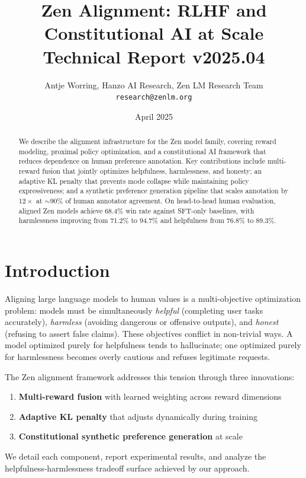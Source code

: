 \documentclass[11pt,a4paper]{article}
\title{\textbf{Zen Alignment: RLHF and Constitutional AI at Scale}\\
\large Technical Report v2025.04}
\author{Antje Worring, Hanzo AI Research, Zen LM Research Team\\
\texttt{research@zenlm.org}}
\date{April 2025}
\begin{document}
\maketitle

\begin{abstract}
We describe the alignment infrastructure for the Zen model family, covering reward
modeling, proximal policy optimization, and a constitutional AI framework that reduces
dependence on human preference annotation. Key contributions include multi-reward
fusion that jointly optimizes helpfulness, harmlessness, and honesty; an adaptive
KL penalty that prevents mode collapse while maintaining policy expressiveness; and
a synthetic preference generation pipeline that scales annotation by $12\times$ at
$\sim$90\% of human annotator agreement. On head-to-head human evaluation, aligned
Zen models achieve 68.4\% win rate against SFT-only baselines, with harmlessness
improving from 71.2\% to 94.7\% and helpfulness from 76.8\% to 89.3\%.
\end{abstract}

\section{Introduction}

Aligning large language models to human values is a multi-objective optimization problem:
models must be simultaneously \textit{helpful} (completing user tasks accurately),
\textit{harmless} (avoiding dangerous or offensive outputs), and \textit{honest}
(refusing to assert false claims). These objectives conflict in non-trivial ways.
A model optimized purely for helpfulness tends to hallucinate; one optimized purely
for harmlessness becomes overly cautious and refuses legitimate requests.

The Zen alignment framework addresses this tension through three innovations:

\begin{enumerate}
  \item \textbf{Multi-reward fusion} with learned weighting across reward dimensions
  \item \textbf{Adaptive KL penalty} that adjusts dynamically during training
  \item \textbf{Constitutional synthetic preference generation} at scale
\end{enumerate}

We detail each component, report experimental results, and analyze the
helpfulness-harmlessness tradeoff surface achieved by our approach.
\end{document}
